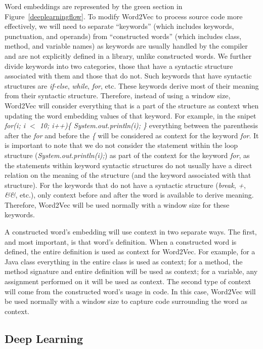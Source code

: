 Word embeddings are represented by the green section in Figure~\ref{deeplearningflow}. To modify Word2Vec to process source code more effectively, we will need to separate ``keywords'' (which includes keywords, punctuation, and operands) from ``constructed words'' (which includes class, method, and variable names) as keywords are usually handled by the compiler and are not explicitly defined in a library, unlike constructed words. We further divide keywords into two categories, those that have a syntactic structure associated with them and those that do not. Such keywords that have syntactic structures are \textit{if-else}, \textit{while}, \textit{for}, etc. These keywords derive most of their meaning from their syntactic structure. Therefore, instead of using a window size, Word2Vec will consider everything that is a part of the structure as context when updating the word embedding values of that keyword. For example, in the snipet \textit{for(i; i $<$ 10; i++)\{ System.out.println(i); \}} everything between the parenthesis after the \textit{for} and before the \textit{\{} will be considered as context for the keyword \textit{for}. It is important to note that we do not consider the statement within the loop structure (\textit{System.out.println(i);}) as part of the context for the keyword \textit{for}, as the statements within keyword syntactic structures do not usually have a direct relation on the meaning of the structure (and the keyword associated with that structure). For the keywords that do not have a syntactic structure (\textit{break}, \textit{+}, \textit{\&\&}, etc.), only context before and after the word is available to derive meaning. Therefore, Word2Vec will be used normally with a window size for these keywords.

A constructed word's embedding will use context in two separate ways. The first, and most important, is that word's definition. When a constructed word is defined, the entire definition is used as context for Word2Vec. For example, for a Java class everything in the entire class is used as context; for a method, the method signature and entire definition will be used as context; for a variable, any assignment performed on it will be used as context. The second type of context will come from the constructed word's usage in code. In this case, Word2Vec will be used normally with a window size to capture code surrounding the word as context.

\subsection{Deep Learning}

